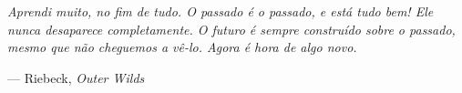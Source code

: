 \begin{epigrafe}
    \vspace*{\fill}
    \begin{flushright}
        \begin{minipage}{0.65\textwidth}
            \raggedleft
            \textit{Aprendi muito, no fim de tudo. O passado é o passado, e está tudo bem! Ele nunca desaparece completamente. O futuro é sempre construído sobre o passado, mesmo que não cheguemos a vê-lo. Agora é hora de algo novo.}

            \medskip
            --- Riebeck, \textit{Outer Wilds}
        \end{minipage}
    \end{flushright}
\end{epigrafe}
